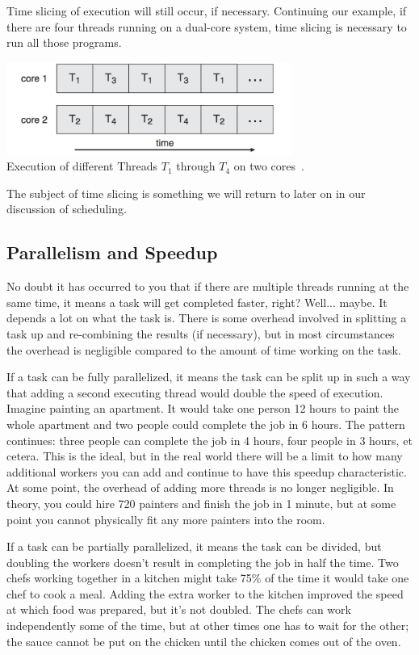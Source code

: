 Time slicing of execution will still occur, if necessary. Continuing our example, if there are four threads running on a dual-core system, time slicing is necessary to run all those programs.

\begin{center}
	\includegraphics[width=0.7\textwidth]{images/dual-core-execution.png}\\
	Execution of different Threads $T_{1}$ through $T_{4}$ on two cores~\cite{osc}.
\end{center}

The subject of time slicing is something we will return to later on in our discussion of scheduling. 

\subsection*{Parallelism and Speedup}

No doubt it has occurred to you that if there are multiple threads running at the same time, it means a task will get completed faster, right? Well... maybe. It depends a lot on what the task is. There is some overhead involved in splitting a task up and re-combining the results (if necessary), but in most circumstances the overhead is negligible compared to the amount of time working on the task.  

If a task can be fully parallelized, it means the task can be split up in such a way that adding a second executing thread would double the speed of execution. Imagine painting an apartment. It would take one person 12 hours to paint the whole apartment and two people could complete the job in 6 hours. The pattern continues: three people can complete the job in 4 hours, four people in 3 hours, et cetera. This is the ideal, but in the real world there will be a limit to how many additional workers you can add and continue to have this speedup characteristic. At some point, the overhead of adding more threads is no longer negligible. In theory, you could hire 720 painters and finish the job in 1 minute, but at some point you cannot physically fit any more painters into the room.

If a task can be partially parallelized, it means the task can be divided, but doubling the workers doesn't result in completing the job in half the time. Two chefs working together in a kitchen might take 75\% of the time it would take one chef to cook a meal. Adding the extra worker to the kitchen improved the speed at which food was prepared, but it's not doubled. The chefs can work independently some of the time, but at other times one has to wait for the other; the sauce cannot be put on the chicken until the chicken comes out of the oven.

